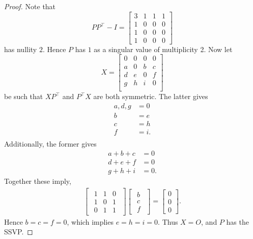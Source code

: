\documentclass[preprint,12pt]{elsarticle}
\newcommand{\trans  }{^\top}
\begin{document}
\begin{proof}
Note that
     \[ PP\trans- I=
    \left[ 
    \begin{array}{cccc}
         3 & 1 & 1 & 1  \\
         1& 0 & 0 & 0\\
         1 & 0 & 0 & 0\\
         1 & 0 & 0 & 0
    \end{array}
    \right]   
    \]
has nullity $2$. 
Hence $P$ has $1$ as a singular value of multiplicity 2. Now let
     \[ X=
    \left[ 
    \begin{array}{cccc}
         0 & 0 & 0 & 0  \\
         a& 0& b & c\\
         d & e& 0& f\\
         g & h & i & 0\\
    \end{array}
    \right]   
    \]
be such that $XP\trans$ and $P\trans X$ are both symmetric. 
The latter gives
      \begin{align*}
      a,d,g &= 0 \\
      b & =  e \\
      c & =  h\\
      f & =  i.\\
\end{align*}
Additionally, the former gives
\begin{align*}
    a+b+c & =0\\
    d+e+f & = 0\\
    g+h +i &= 0.
\end{align*}
Together these imply,
\begin{align*}
\begin{bmatrix}
\begin{array}{ccc}
1 & 1 &0 \\
1 & 0 & 1\\
0 & 1 & 1 \end{array}
\end{bmatrix}
\begin{bmatrix}
\begin{array}{c}
b\\
c\\
f
\end{array} 
\end{bmatrix}= \begin{bmatrix}
    0\\
    0\\
    0
\end{bmatrix}.
\end{align*}
Hence $b=c=f=0$, which implies $e=h=i=0$.
Thus $X = O$, and $P$ has the SSVP.
\end{proof}
\end{document}
